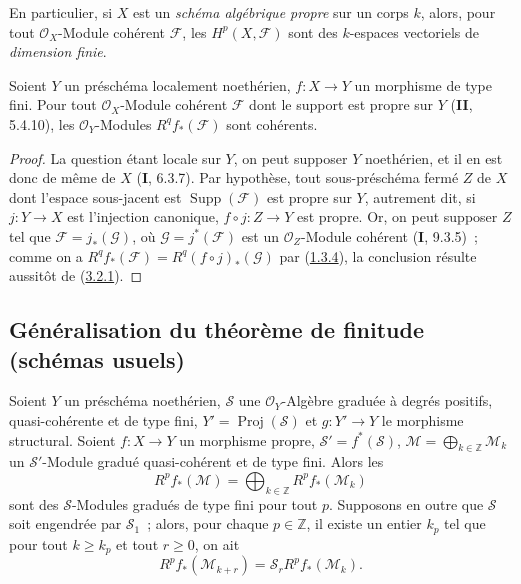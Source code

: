 En particulier, si $X$ est un \emph{schéma algébrique propre} sur un corps
$k$, alors, pour tout $\mathcal O_X$-Module cohérent $\mathcal F$, les
$H^p(X,\mathcal F)$ sont des $k$-espaces vectoriels de \emph{dimension
finie}.

\begin{corollary}[3.2.4]
\label{III.3.2.4-fr}
Soient $Y$ un préschéma localement noethérien, $f:X\to Y$ un morphisme de
type fini. Pour tout $\mathcal O_X$-Module cohérent $\mathcal F$ dont le
support est propre sur $Y$ (\textbf{II}, 5.4.10), les $\mathcal O_Y$-Modules
$R^qf_*(\mathcal F)$ sont cohérents.
\end{corollary}

\begin{proof}
La question étant locale sur $Y$, on peut supposer $Y$ noethérien, et il en
est donc de même de $X$ (\textbf{I}, 6.3.7). Par hypothèse, tout sous-préschéma fermé
$Z$ de $X$ dont l'espace sous-jacent est $\operatorname{Supp}(\mathcal F)$
est propre sur $Y$, autrement dit, si $j:Y\to X$ est l'injection canonique,
$f\circ j:Z\to Y$ est propre. Or, on peut supposer $Z$ tel que
$\mathcal F=j_*(\mathcal G)$, où $\mathcal G=j^*(\mathcal F)$ est un
$\mathcal O_Z$-Module cohérent (\textbf{I}, 9.3.5)~; comme on a
$R^qf_*(\mathcal F)=R^q(f\circ j)_*(\mathcal G)$ par
(\hyperref[III.1.3.4-fr]{1.3.4}), la conclusion résulte aussitôt de
(\hyperref[III.3.2.1-fr]{3.2.1}).
\end{proof}

\subsection{Généralisation du théorème de finitude (schémas usuels)}
\label{subsection:III.3.3-fr}

\begin{proposition}[3.3.1]
\label{III.3.3.1-fr}
Soient $Y$ un préschéma noethérien, $\mathcal S$ une
$\mathcal O_Y$-Algèbre graduée à degrés positifs, quasi-cohérente et de type
fini, $Y'=\operatorname{Proj}(\mathcal S)$ et $g:Y'\to Y$ le morphisme
structural. Soient $f:X\to Y$ un morphisme propre,
$\mathcal S'=f^*(\mathcal S)$,
$\mathcal M=\bigoplus_{k\in\mathbb Z}\mathcal M_k$ un $\mathcal S'$-Module
gradué quasi-cohérent et de type fini. Alors les
\[
R^pf_*(\mathcal M)=\bigoplus_{k\in\mathbb Z}R^pf_*(\mathcal M_k)
\]
sont des $\mathcal S$-Modules gradués de type fini pour tout $p$. Supposons
en outre que $\mathcal S$ soit engendrée par $\mathcal S_1$~; alors, pour
chaque $p\in\mathbb Z$, il existe un entier $k_p$ tel que pour tout
$k\geq k_p$ et tout $r\geq0$, on ait
\[
R^pf_*(\mathcal M_{k+r})=\mathcal S_rR^pf_*(\mathcal M_k).
\tag{3.3.1.1}\label{III.3.3.1.1-fr}
\]
\end{proposition}

